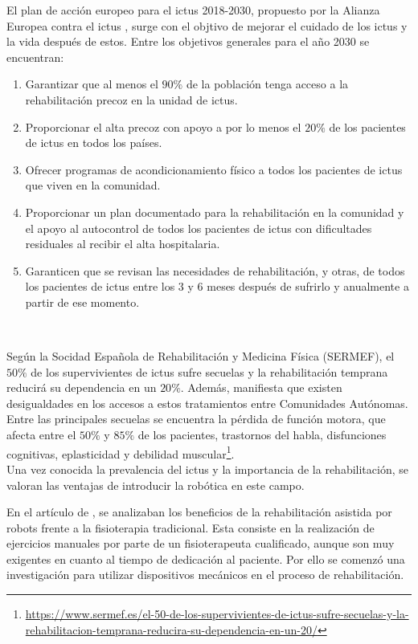 El plan de acción europeo para el ictus 2018-2030, propuesto por la Alianza Europea contra el ictus \cite{perales2a}, surge con el objtivo de mejorar el cuidado de los ictus y la vida después de estos.
Entre los objetivos generales para el año 2030 se encuentran:
\begin{enumerate}
    \item Garantizar que al menos el $90\%$ de la población tenga acceso a la rehabilitación precoz en la unidad de ictus.
    \item Proporcionar el alta precoz con apoyo a por lo menos el $20\%$ de los pacientes de ictus en todos los países.
    \item Ofrecer programas de acondicionamiento físico a todos los pacientes de ictus que viven en la comunidad.
    \item Proporcionar un plan documentado para la rehabilitación en la comunidad y el apoyo al autocontrol de todos los pacientes de ictus con dificultades residuales al recibir el alta hospitalaria.
    \item Garanticen que se revisan las necesidades de rehabilitación, y otras, de todos los pacientes de ictus entre los 3 y 6 meses después de sufrirlo y anualmente a partir de ese momento.
\end{enumerate}\

Según la Socidad Española de Rehabilitación y Medicina Física (SERMEF), el $50\%$ de los supervivientes de ictus sufre secuelas y la rehabilitación temprana reducirá su dependencia en un $20\%$.
Además, manifiesta que existen desigualdades en los accesos a estos tratamientos entre Comunidades Autónomas.
Entre las principales secuelas se encuentra la pérdida de función motora, que afecta entre el $50\%$ y $85\%$ de los pacientes, trastornos del habla, disfunciones cognitivas, eplasticidad y debilidad muscular\footnote{\url{https://www.sermef.es/el-50-de-los-supervivientes-de-ictus-sufre-secuelas-y-la-rehabilitacion-temprana-reducira-su-dependencia-en-un-20/}}.\\

Una vez conocida la prevalencia del ictus y la importancia de la rehabilitación, se valoran las ventajas de introducir la robótica en este campo.

En el artículo de \cite{perales3a}, se analizaban los beneficios de la rehabilitación asistida por robots frente a la fisioterapia tradicional.
Esta consiste en la realización de ejercicios manuales por parte de un fisioterapeuta cualificado, aunque son muy exigentes en cuanto al tiempo de dedicación al paciente.
Por ello se comenzó una investigación para utilizar dispositivos mecánicos en el proceso de rehabilitación.

